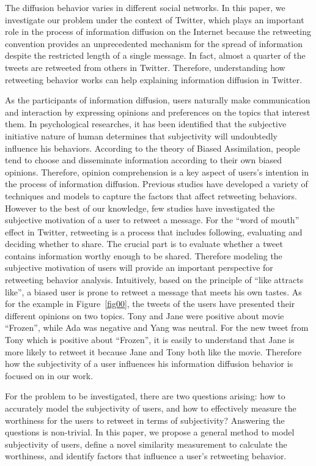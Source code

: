 \documentclass[letterpaper]{article}
\begin{document}
The diffusion behavior varies in different social networks. In this paper, we investigate our problem under the context of Twitter, which plays an important role in the process of information diffusion on the Internet because the retweeting convention provides an unprecedented mechanism for the spread of information despite the restricted length of a single message. 
In fact, almost a quarter of the tweets are retweeted from others in Twitter\cite{yang2010understanding}. Therefore, understanding how retweeting behavior works can help explaining information diffusion in Twitter. 

As the participants of information diffusion, users naturally make communication and interaction by expressing opinions and preferences on the topics that interest them. In psychological researches, it has been identified that the subjective initiative nature of human determines that subjectivity will undoubtedly influence his behaviors\cite{moore2008awareness}. According to the theory of Biased Assimilation, people tend to choose and disseminate information according to their own biased opinions\cite{Hyman2000}. Therefore, opinion comprehension is a key aspect of users's intention in the process of information diffusion. 
Previous studies have developed a variety of techniques and models to capture the factors that affect retweeting behaviors\cite{macskassy2011people,feng2013retweet}. However to the best of our knowledge, few studies have investigated the subjective motivation of a user to retweet a message. 
For the  ``word of mouth'' effect in Twitter, retweeting is a process that includes following, evaluating and deciding whether to share. The crucial part is to evaluate whether a tweet contains information worthy enough to be shared.  
Therefore modeling the subjective motivation of users will provide an important perspective for retweeting behavior analysis. 
Intuitively, based on the principle of ``like attracts like'', a biased user is prone to retweet a message that meets his own tastes. As for the example in Figure~\ref{fig00}, the tweets of the users have presented their different opinions on two topics. Tony and Jane were positive about movie ``Frozen'', while Ada was negative and Yang was neutral. For the new tweet from Tony which is positive about ``Frozen'', it is easily to understand that Jane is more likely to retweet it because Jane and Tony both like the movie. Therefore how the subjectivity of a user influences his information diffusion behavior is focused on in our work.

For the problem to be investigated, there are two questions arising: how to accurately model the subjectivity of users, and how to effectively measure the worthiness for the users to retweet in terms of subjectivity? 
Answering the questions is non-trivial. 
In this paper, we propose a general method to model subjectivity of users, define a novel similarity measurement to calculate the worthiness,  and identify factors that influence a user's retweeting behavior. 
\end{document}
